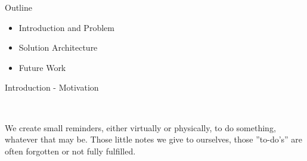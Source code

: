 \documentclass[newPxFont,noprogressbar,table]{beamer}
\begin{document}
	
	\begin{frame}{Outline}
		\vspace*{-7em}
		\begin{itemize}
			\item Introduction and Problem 
			
			\item Solution Architecture
			
			\item Future Work
		\end{itemize}
	\end{frame}
	
	\begin{frame}{Introduction - Motivation}
		
		\vspace*{-2em}
		\centering
		
		\vspace*{1em}
		\\
		
		\vspace*{3em}

		{\normalsize We create small reminders,
			either virtually or physically, to do something, whatever that may be. Those little notes we give to
			ourselves, those ”to-do’s” are often forgotten or not fully fulfilled. }
		
	\end{frame}
	
\end{document}
